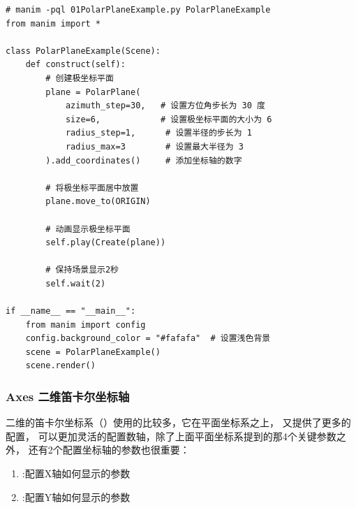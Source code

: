 \begin{lstlisting}[style=pythonstyle]
# manim -pql 01PolarPlaneExample.py PolarPlaneExample
from manim import *

class PolarPlaneExample(Scene):
    def construct(self):
        # 创建极坐标平面
        plane = PolarPlane(
            azimuth_step=30,   # 设置方位角步长为 30 度
            size=6,            # 设置极坐标平面的大小为 6
            radius_step=1,      # 设置半径的步长为 1
            radius_max=3        # 设置最大半径为 3
        ).add_coordinates()     # 添加坐标轴的数字

        # 将极坐标平面居中放置
        plane.move_to(ORIGIN)

        # 动画显示极坐标平面
        self.play(Create(plane))

        # 保持场景显示2秒
        self.wait(2)

if __name__ == "__main__":
    from manim import config
    config.background_color = "#fafafa"  # 设置浅色背景
    scene = PolarPlaneExample()
    scene.render()
\end{lstlisting}      

\subsubsection{Axes 二维笛卡尔坐标轴}
\label{subsubsec:Manim基本图形-二维笛卡尔坐标轴}
二维的笛卡尔坐标系（）使用的比较多，它在平面坐标系之上，
又提供了更多的配置， 可以更加灵活的配置数轴，除了上面平面坐标系提到的那4个关键参数之外， 
还有2个配置坐标轴的参数也很重要：
\begin{enumerate}[label=\arabic*)]
    \item {}:配置X轴如何显示的参数
    \item {}:配置Y轴如何显示的参数
\end{enumerate}

